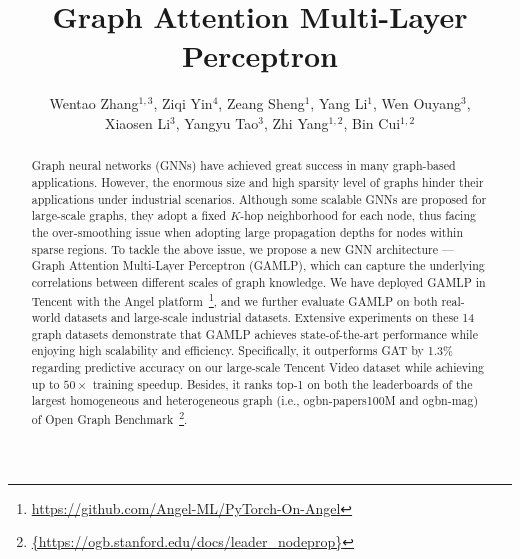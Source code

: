 \documentclass[sigconf]{acmart}
\newcommand{\sys}{\textsc{GAMLP}\xspace}
\newcommand{\blue}[1]{\textcolor{blue}{#1}}
\begin{document}
\fancyhead{}
\title{Graph Attention Multi-Layer Perceptron}

\author{Wentao Zhang$^{1,3}$, Ziqi Yin$^{4}$, Zeang Sheng$^{1}$, Yang Li$^{1}$, Wen Ouyang$^{3}$, \\Xiaosen Li$^{3}$, Yangyu Tao$^{3}$, 
Zhi Yang$^{1,2}$, 
Bin Cui$^{1,2}$}
\renewcommand{\shortauthors}{WT Zhang, et al.}
\renewcommand{\authors}{Wentao Zhang, Ziqi Yin, Zeang Sheng, Yang Li, Wen Ouyang, Xiaosen Li, Yangyu Tao, Zhi Yang, and Bin Cui}
\renewcommand{\shortauthors}{Wentao Zhang, et al.}

\begin{abstract}
Graph neural networks (GNNs) have achieved great success in many graph-based applications. However, the enormous size and high sparsity level of graphs hinder their applications under industrial scenarios.
Although some scalable GNNs are proposed for large-scale graphs, they adopt a fixed $K$-hop neighborhood for each node, thus facing the over-smoothing issue when adopting large propagation depths for nodes within sparse regions.
To tackle the above issue, we propose a new GNN architecture --- Graph Attention Multi-Layer Perceptron (GAMLP), which can capture the underlying correlations between different scales of graph knowledge.
We have deployed \sys in Tencent with the Angel platform~\footnote{\blue{\url{https://github.com/Angel-ML/PyTorch-On-Angel}}}, and we further evaluate GAMLP on both real-world datasets and large-scale industrial datasets.
Extensive experiments on these 14 graph datasets demonstrate that GAMLP achieves state-of-the-art performance while enjoying high scalability and efficiency. 
Specifically, it outperforms GAT by 1.3\% regarding predictive accuracy on our large-scale Tencent Video dataset while achieving up to $50\times$ training speedup.
Besides, it ranks top-1 on both the leaderboards of the largest homogeneous and heterogeneous graph (i.e., ogbn-papers100M and ogbn-mag) of Open Graph Benchmark~\footnote{\blue{\url{{https://ogb.stanford.edu/docs/leader\_nodeprop}}}}.
\end{abstract}
\end{document}
